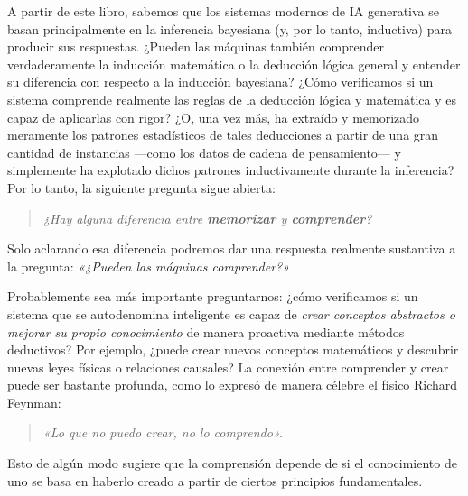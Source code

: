 \documentclass[../../book-main_es.tex]{subfiles}
\begin{document}
A partir de este libro, sabemos que los sistemas modernos de IA generativa se basan principalmente 
en la inferencia bayesiana (y, por lo tanto, inductiva) para producir sus respuestas. ¿Pueden 
las máquinas también comprender verdaderamente la inducción matemática o la deducción lógica 
general y entender su diferencia con respecto a la inducción bayesiana? 
¿Cómo verificamos si un sistema comprende realmente las reglas de 
la deducción lógica y matemática y es capaz de aplicarlas con rigor? ¿O, 
una vez más, ha extraído y memorizado meramente los patrones estadísticos de tales deducciones 
a partir de una gran cantidad de instancias ---como los datos de cadena de pensamiento--- y 
simplemente ha explotado dichos patrones inductivamente durante la inferencia? Por lo tanto, la siguiente pregunta sigue abierta:
\begin{quote}
    \centering
    \textit{¿Hay alguna diferencia entre \textbf{memorizar} y
    \textbf{comprender}?}
\end{quote}
Solo aclarando esa diferencia podremos dar una
respuesta realmente sustantiva a la pregunta: \textit{«¿Pueden las máquinas comprender?»}

Probablemente sea más importante preguntarnos: ¿cómo verificamos si un sistema que se autodenomina
inteligente es capaz de \textit{crear conceptos abstractos o mejorar su propio conocimiento} de manera proactiva mediante métodos deductivos? Por ejemplo, ¿puede crear nuevos conceptos matemáticos
y descubrir nuevas leyes físicas o relaciones causales?
La conexión entre comprender y crear puede ser bastante profunda, como lo expresó de manera célebre el físico Richard Feynman:
\begin{quote}
    \centering
    \textit{«Lo que no puedo crear, no lo comprendo».}
\end{quote}
Esto de algún modo sugiere que la comprensión depende de si el conocimiento de uno se basa en haberlo creado a partir de ciertos principios fundamentales.
\end{document}
